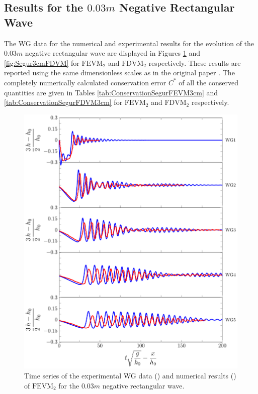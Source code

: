 \subsection{Results for the $0.03m$ Negative Rectangular Wave}
The WG data for the numerical and experimental results for the evolution of the $0.03m$ negative rectangular wave are displayed in Figures \ref{fig:Segur3cmFEVM} and \ref{fig:Segur3cmFDVM} for $\text{FEVM}_2$ and $\text{FDVM}_2$ respectively. These results are reported using the same dimensionless scales as in the original paper \cite{Hammack-Segur-1978-337}. The completely numerically calculated conservation error $C^*$ of all the conserved quantities are given in Tables \ref{tab:ConservationSegurFEVM3cm} and \ref{tab:ConservationSegurFDVM3cm} for $\text{FEVM}_2$ and $\text{FDVM}_2$ respectively.
\begin{figure}
	\centering
	\includegraphics[width=\textwidth]{./chp6/figures/Experiment/Segur/LongWGsFEVM3cm.pdf}
	\caption{Time series of the experimental WG data ({\color{red}\solidrule}) and numerical results ({\color{blue}\solidrule}) of $\text{FEVM}_2$ for the $0.03m$ negative rectangular wave.}
	\label{fig:Segur3cmFEVM}
\end{figure}
